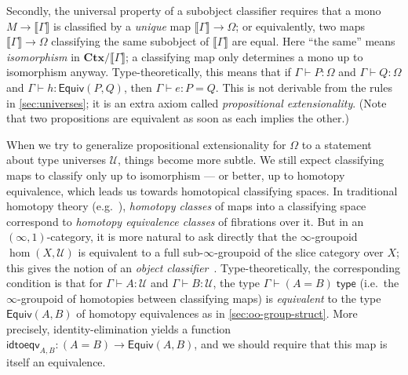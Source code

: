 \documentclass[10pt]{article}
\def\oo{\ensuremath{\infty}}
\def\ty{\;\mathsf{type}}
\def\m#1{\llbracket#1\rrbracket}
\def\types{\vdash}
\def\U{\mathscr{U}}
\def\equiv{\mathsf{Equiv}}
\def\Ctx{\mathbf{Ctx}}
\numberwithin{equation}{section}
\begin{document}
Secondly, the universal property of a subobject classifier requires that a mono $M \to \m\Gamma$ is classified by a \emph{unique} map $\m\Gamma\to\Omega$; or equivalently, two maps $\m\Gamma\to\Omega$ classifying the same subobject of $\m\Gamma$ are equal.
Here ``the same'' means \emph{isomorphism} in $\Ctx/\m\Gamma$; a classifying map only determines a mono up to isomorphism anyway.
Type-theoretically, this means that if $\Gamma\types P:\Omega$ and $\Gamma\types Q:\Omega$ and $\Gamma\types h:\equiv(P,Q)$, then $\Gamma\types e:P=Q$.
This is not derivable from the rules in \cref{sec:universes}; it is an extra axiom called \emph{propositional extensionality}.
(Note that two propositions are equivalent as soon as each implies the other.)

When we try to generalize propositional extensionality for $\Omega$ to a statement about type universes $\U$, things become more subtle.
We still expect classifying maps to classify only up to isomorphism --- or better, up to homotopy equivalence, which leads us towards homotopical classifying spaces.
In traditional homotopy theory (e.g.~\cite{may:csf}), \emph{homotopy classes} of maps into a classifying space correspond to \emph{homotopy equivalence classes} of fibrations over it.
But in an $(\oo,1)$-category, it is more natural to ask directly that the \oo-groupoid $\hom(X,\U)$ is equivalent to a full sub-\oo-groupoid of the slice category over $X$; this gives the notion of an \emph{object classifier}~\cite[\S6.1.6]{lurie:higher-topoi}.
Type-theoretically, the corresponding condition is that for $\Gamma\types A:\U$ and $\Gamma\types B:\U$, the type $\Gamma \types (A=B) \ty$ (i.e.\ the \oo-groupoid of homotopies between classifying maps) is \emph{equivalent} to the type $\equiv(A,B)$ of homotopy equivalences as in \cref{sec:oo-group-struct}.
More precisely, identity-elimination yields a function $\mathsf{idtoeqv}_{A,B} : (A=B) \to \equiv(A,B)$, and we should require that this map is itself an equivalence.
\end{document}
